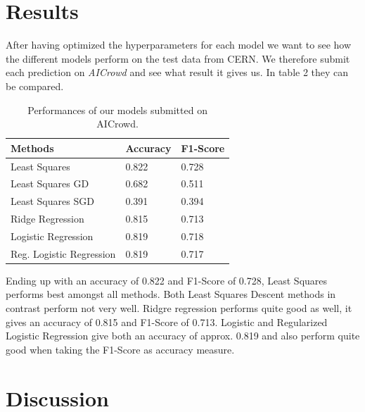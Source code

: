 \documentclass[10pt,conference,compsocconf]{IEEEtran}
\begin{document}
\newpage

\section{Results}


After having optimized the hyperparameters for each model we want to see how the different models perform on the test data from CERN. We therefore submit each prediction on \textit{AICrowd} and see what result it gives us. In table 2 they can be compared.


\begin{table}[h]
	\centering
	\begin{tabular}[c]{|l||l|l|}
		\hline
		Methods&Accuracy&F1-Score\\
	\hline
	Least Squares&0.822&0.728\\
	Least Squares GD&0.682&0.511\\
	Least Squares SGD&0.391&0.394\\		
	Ridge Regression&0.815&0.713\\
	Logistic Regression&0.819&0.718\\
	Reg. Logistic Regression&0.819&0.717\\
	\hline
	\end{tabular}
	\caption{Performances of our models submitted on AICrowd.}
	\label{tab:perform}
\end{table}

Ending up with an accuracy of 0.822 and F1-Score of 0.728, Least Squares performs best amongst all methods. Both Least Squares Descent methods in contrast perform not very well. 
Ridgre regression performs quite good as well, it gives an accuracy of 0.815 and F1-Score of 0.713.
Logistic and Regularized Logistic Regression give both an accuracy of approx. 0.819 and also perform quite good when taking the F1-Score as accuracy measure. 


\section{Discussion}
\end{document}
